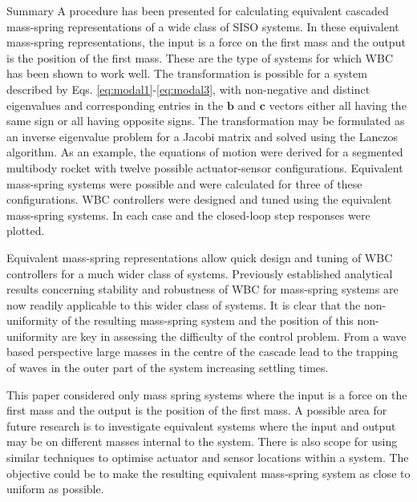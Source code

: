 \documentclass{beamer}
\begin{document}
\begin{frame}{Summary}
A procedure has been presented for calculating equivalent cascaded mass-spring representations of a wide class of SISO systems.
In these equivalent mass-spring representations, the input is a force on the first mass and the output is the position of the first mass.
These are the type of systems for which WBC has been shown to work well.
The transformation is possible for a system described by Eqs. \ref{eq:modal1}-\ref{eq:modal3}, with non-negative and distinct eigenvalues and corresponding entries in the $\mathbf{b}$ and $\mathbf{c}$ vectors either all having the same sign or all having opposite signs.
The transformation may be formulated as an inverse eigenvalue problem for a Jacobi matrix and solved using the Lanczos algorithm.
As an example, the equations of motion were derived for a segmented multibody rocket with twelve possible actuator-sensor configurations.
Equivalent mass-spring systems were possible and were calculated for three of these configurations. 
WBC controllers were designed and tuned using the equivalent mass-spring systems.
In each case and the closed-loop step responses were plotted.

Equivalent mass-spring representations allow quick design and tuning of WBC controllers for a much wider class of systems.
Previously established analytical results concerning stability and robustness of WBC for mass-spring systems are now readily applicable to this wider class of systems.
It is clear that the non-uniformity of the resulting mass-spring system and the position of this non-uniformity are key in assessing the difficulty of the control problem.
From a wave based perspective large masses in the centre of the cascade lead to the trapping of waves in the outer part of the system increasing settling times.

This paper considered only mass spring systems where the input is a force on the first mass and the output is the position of the first mass.
A possible area for future research is to investigate equivalent systems where the input and output may be on different masses internal to the system.
There is also scope for using similar techniques to optimise actuator and sensor locations within a system.
The objective could be to make the resulting equivalent mass-spring system as close to uniform as possible.


\end{frame}
\end{document}
